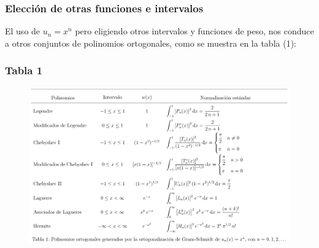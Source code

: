 \documentclass[12pt]{beamer}
\begin{document}
\begin{frame}
\frametitle{Elección de otras funciones e intervalos}
El uso de $u_{n} = x^{n}$ pero eligiendo otros intervalos y funciones de peso, nos conduce a otros conjuntos de polinomios ortogonales, como se muestra en la tabla (1):
\end{frame}
\begin{frame}[plain]
\frametitle{Tabla 1}
\begin{figure}
   \centering
   \includegraphics[scale=0.45]{Imagenes/Tabla_01.png}
\end{figure}
\end{frame}
\end{document}

